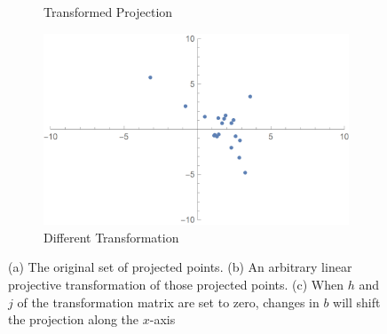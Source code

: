 \documentclass[11pt]{extarticle}
\begin{document}
\begin{figure}[!ht]
\begin{subfigure}{.3\textwidth}
            \caption{Transformed Projection}
        \end{subfigure}
        \begin{subfigure}{.3\textwidth}
            \centering
            \includegraphics[scale=.1]{ma3.png}
            \caption{Different Transformation}
        \end{subfigure}
        \caption{(a) The original set of projected points. (b) An arbitrary linear projective transformation of those projected points. (c) When $h$ and $j$ of the transformation matrix are set to zero, changes in $b$ will shift the projection along the $x$-axis}
    \end{figure}
\end{document}
